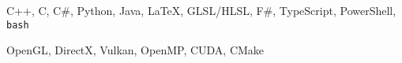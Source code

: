 \begin{cvskills}
	{C++, C, C\#, Python, Java, \LaTeX{}, GLSL/HLSL, F\#, TypeScript, PowerShell, \texttt{bash}} %


	{OpenGL, DirectX, Vulkan, OpenMP, CUDA, CMake} %

\end{cvskills}
